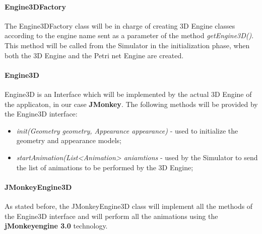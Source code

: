 \paragraph{Engine3DFactory}

The Engine3DFactory class will be in charge of creating 3D Engine classes according to the engine name sent as a parameter of the method \textit{getEngine3D()}. This method will be called from the Simulator in the initialization phase, when both the 3D Engine and the Petri net Engine are created. 

\paragraph{Engine3D}

Engine3D is an Interface which will be implemented by the actual 3D Engine of the applicaton, in our case \textbf{JMonkey}. The following methods will be provided by the Engine3D interface: 
\begin{itemize}
\item \textit{init(Geometry geometry, Appearance appearance)} - used to initialize the geometry and appearance models;
\item \textit{startAnimation(List<Animation> aniamtions} - used by the Simulator to send the list of animations to be performed by the 3D Engine; 
\end{itemize}

\paragraph{JMonkeyEngine3D}

As stated before, the JMonkeyEngine3D class will implement all the methods of the Engine3D interface and will perform all the animations using the \textbf{jMonkeyengine 3.0} technology.  